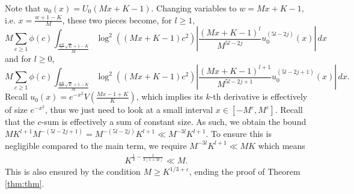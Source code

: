 \documentclass[reqno, 12pt]{amsart}
\renewcommand{\geq}{\geqslant}
\begin{document}
{Note that $u_0(x) = U_0( Mx+K-1)$.} Changing variables to $w = Mx+K-1$, i.e. $x = \frac{w+1-K}{M}$, these two pieces become, for $l \geq 1$, 
\[ M \sum_{c \geq 1} \phi(c) \int_{\frac{\frac{4\pi K}{c} \sqrt{E} + 1 - K}{M} } \log^2 ((Mx+K-1)c^2) \left| \frac{(Mx+K-1)^l}{M^{5l-2j}}  u_0^{(5l-2j)} (x) \right| \,dx \]
and for $l \geq 0$, 
\[ M \sum_{c \geq 1} \phi(c) \int_{\frac{\frac{4\pi K}{c} \sqrt{E} + 1 - K}{M}} \log^2 ((Mx+K-1)c^2) \left| \frac{(Mx+K-1)^{l+1}}{M^{5l-2j+1}}  u_0^{(5l-2j+1)} (x) \right| \,dx. \]
Recall $u_0(x) = e^{-x^2} V(\frac{Mx-1+K}{K})$, {which implies its $k$-th derivative is effectively of size} $e^{-x^2}$, thus we just need to look at a small interval $x \in [-M^{\varepsilon},M^{\varepsilon}]$. Recall that the $c$-sum is effectively a sum of constant size. As such, we obtain the bound $M K^{l+1} M^{-(5l-2j+1)} = M^{-(5l-2j)} K^{l+1} \ll M^{-3l} K^{l+1}$. To ensure this is negligible compared to the main term, we require $M^{-3l} K^{l+1} \ll MK$ which means
\begin{align*}
 K^{\frac{1}{3} - \frac{1}{3(1+3l)}} \ll M.
\end{align*}
This is also ensured by the condition $M \geqslant K^{1/3+\varepsilon}$, ending the proof of Theorem \ref{thm:thm}.






\nocite{*}



\end{document}
